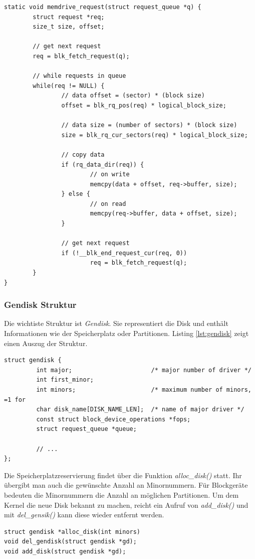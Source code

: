 \begin{lstlisting}[label=lst:blk_rq_handler,caption=Request Queue - Handler-Funktion]
static void memdrive_request(struct request_queue *q) {
        struct request *req;
        size_t size, offset;

        // get next request
        req = blk_fetch_request(q);

        // while requests in queue
        while(req != NULL) {
                // data offset = (sector) * (block size)
                offset = blk_rq_pos(req) * logical_block_size;

                // data size = (number of sectors) * (block size)
                size = blk_rq_cur_sectors(req) * logical_block_size;

                // copy data
                if (rq_data_dir(req)) {
                        // on write
                        memcpy(data + offset, req->buffer, size);
                } else {
                        // on read
                        memcpy(req->buffer, data + offset, size);
                }

                // get next request
                if (!__blk_end_request_cur(req, 0))
                        req = blk_fetch_request(q);
        }
}
\end{lstlisting}

\subsubsection{Gendisk Struktur}

Die wichtiste Struktur ist \emph{Gendisk}. Sie representiert die Disk und enthält Informationen wie der Speicherplatz oder Partitionen. Listing \ref{lst:gendisk} zeigt einen
Auszug der Struktur.
\begin{lstlisting}[label=lst:gendisk,caption=include/linux/genhd.h]
struct gendisk {
         int major;                      /* major number of driver */
         int first_minor;
         int minors;                     /* maximum number of minors, =1 for
         char disk_name[DISK_NAME_LEN];  /* name of major driver */
         const struct block_device_operations *fops;
         struct request_queue *queue;

         // ...
};
\end{lstlisting} \hfill

Die Speicherplatzreservierung findet über die Funktion \emph{alloc\_disk()} statt. Ihr übergibt man auch die gewünschte Anzahl an Minornummern. Für Blockgeräte bedeuten die Minornummern
die Anzahl an möglichen Partitionen. Um dem Kernel die neue Disk bekannt zu machen, reicht ein Aufruf von \emph{add\_disk()} und mit \emph{del\_gensik()} kann diese wieder entfernt werden.
\begin{lstlisting}[caption=Gendisk Funktionen]
struct gendisk *alloc_disk(int minors)
void del_gendisk(struct gendisk *gd);
void add_disk(struct gendisk *gd);
\end{lstlisting}


